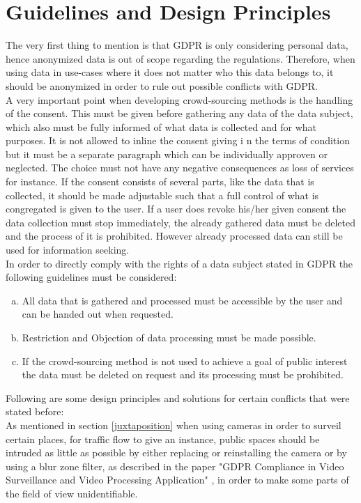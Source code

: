 \documentclass[a4paper,12pt]{report}
\begin{document}
	\section{Guidelines and Design Principles}
	\startsection
		The very first thing to mention is that GDPR is only considering personal data, hence anonymized data is out of scope regarding the regulations. Therefore, when using data in use-cases where it does not matter who this data belongs to, it should be anonymized in order to rule out possible conflicts with GDPR. \\
		A very important point when developing crowd-sourcing methods is the handling of the consent. This must be given before gathering any data of the data subject, which also must be fully informed of what data is collected and for what purposes. It is not allowed to inline the consent giving i n the terms of condition but it must be a separate paragraph which can be individually approven or neglected. The choice must not have any negative consequences as loss of services for instance. If the consent consists of several parts, like the data that is collected, it should be made adjustable such that a full control of what is congregated is given to the user. If a user does revoke his/her given consent the data collection must stop immediately, the already gathered data must be deleted and the process of it is prohibited. However already processed data can still be used for information seeking. \\
		In order to directly comply with the rights of a data subject stated in GDPR the following guidelines must be considered:
		\begin{enumerate}[(a)]
			\item All data that is gathered and processed must be accessible by the user and can be handed out when requested.
			\item Restriction and Objection of data processing must be made possible.
			\item If the crowd-sourcing method is not used to achieve a goal of public interest the data must be deleted on request and its processing must be prohibited.
		\end{enumerate}
		Following are some design principles and solutions for certain conflicts that were stated before: \\	
		As mentioned in section \ref{juxtaposition} when using cameras in order to surveil certain places, for traffic flow to give an instance, public spaces should be intruded as little as possible by either replacing or reinstalling the camera or by using a blur zone filter, as described in the paper "GDPR Compliance in Video Surveillance and Video Processing Application" \cite{GDPRandSurveillanceCameras}, in order to make some parts of the field of view unidentifiable. \\
\end{document}
